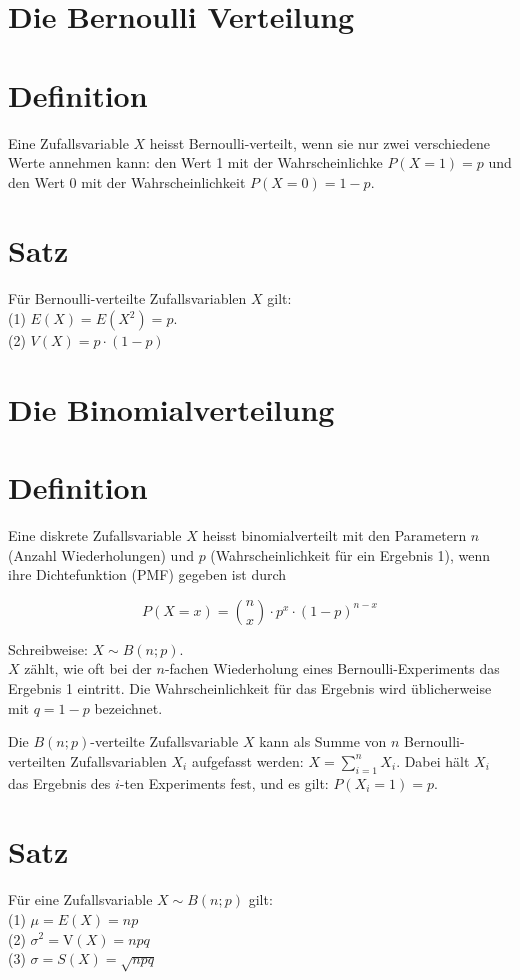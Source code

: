 \documentclass[10pt]{article}
\begin{document}
\section*{Die Bernoulli Verteilung}
\section*{Definition}
Eine Zufallsvariable $X$ heisst Bernoulli-verteilt, wenn sie nur zwei verschiedene Werte annehmen kann: den Wert 1 mit der Wahrscheinlichke $P(X=1)=p$ und den Wert 0 mit der Wahrscheinlichkeit $P(X=0)=1-p$.

\section*{Satz}
Für Bernoulli-verteilte Zufallsvariablen $X$ gilt:\\
(1) $E(X)=E\left(X^{2}\right)=p$.\\
(2) $V(X)=p \cdot(1-p)$

\section*{Die Binomialverteilung}
\section*{Definition}
Eine diskrete Zufallsvariable $X$ heisst binomialverteilt mit den Parametern $n$ (Anzahl Wiederholungen) und $p$ (Wahrscheinlichkeit für ein Ergebnis 1), wenn ihre Dichtefunktion (PMF) gegeben ist durch

$$
P(X=x)=\binom{n}{x} \cdot p^{x} \cdot(1-p)^{n-x}
$$

Schreibweise: $X \sim B(n ; p)$.\\
$X$ zählt, wie oft bei der $n$-fachen Wiederholung eines Bernoulli-Experiments das Ergebnis 1 eintritt. Die Wahrscheinlichkeit für das Ergebnis wird üblicherweise mit $q=1-p$ bezeichnet.

Die $B(n ; p)$-verteilte Zufallsvariable $X$ kann als Summe von $n$ Bernoulli-verteilten Zufallsvariablen $X_{i}$ aufgefasst werden: $X=\sum_{i=1}^{n} X_{i}$. Dabei hält $X_{i}$ das Ergebnis des $i$-ten Experiments fest, und es gilt: $P\left(X_{i}=1\right)=p$.

\section*{Satz}
Für eine Zufallsvariable $X \sim B(n ; p)$ gilt:\\
(1) $\mu=E(X)=n p$\\
(2) $\sigma^{2}=\mathrm{V}(X)=n p q$\\
(3) $\sigma=S(X)=\sqrt{n p q}$
\end{document}
